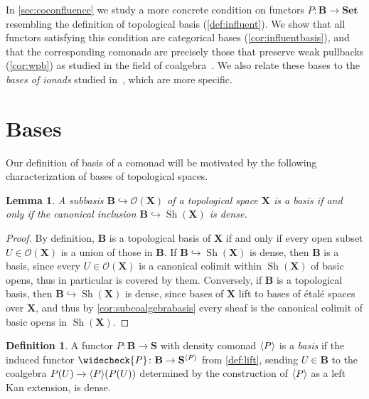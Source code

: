 \documentclass[11pt, oneside, article]{memoir}
\theoremstyle{plain}
\newtheorem{lemma}[theorem]{Lemma}
\theoremstyle{definition}
\newtheorem{definition}[def]{Definition}
\theoremstyle{remark}
\DeclareMathOperator{\Sh}{Sh}
\DeclarePairedDelimiter{\gen}{\langle}{\rangle}
\newcommand{\namedcat}[1]{\mathbf{#1}}
\newcommand{\cat}[1]{\mathbf{#1}}
\newcommand{\spa}[1]{\mathbf{#1}}
\newcommand{\Set}{\namedcat{Set}}
\newcommand{\CoalgOn}[2]{{#2}^{#1}}
\newcommand{\CoalgS}[1]{\CoalgOn{#1}{\bS}}
\newcommand{\lift}[1]{\widecheck{#1}}
\newcommand{\ph}[1]{#1}
\newcommand{\xU}{U}
\newcommand{\bB}{\cat{B}}
\newcommand{\bS}{\cat{S}}
\newcommand{\pP}{\ph{P}}
\newcommand{\cP}{\gen{\pP}}
\newcommand{\lP}{\lift{\pP}}
\newcommand{\tX}{\spa{X}}
\newcommand{\PS}{\CoalgS{\cP}}
\newcommand{\opens}[1]{\mathcal{O}(#1)}
\begin{document}
In \cref{sec:coconfluence} we study a more concrete condition on
functors $\pP \colon \bB \to \Set$ resembling the definition of
topological basis (\cref{def:influent}). We show that all functors
satisfying this condition are categorical bases
(\cref{cor:influentbasis}), and that the corresponding comonads are
precisely those that preserve weak pullbacks (\cref{cor:wpb}) as
studied in the field of
coalgebra~\cite{rutten,johnstone-power-tsujishita-watanabe-worrell,jacobs,adamek-velebil,gumm-schroder,gumm:elements}. We
also relate these bases to the \emph{bases of ionads} studied
in~\cite{garner:ionads}, which are more specific.

\section{Bases}\label{sec:basessub}

Our definition of basis of a comonad will be motivated by the
following characterization of bases of topological spaces.

\begin{lemma}\label{lem:topbasis}
  A subbasis $\bB \hookrightarrow \opens{\tX}$ of a topological
  space $\tX$ is a basis if and only if the canonical inclusion
  $\bB \hookrightarrow \Sh(\tX)$ is dense.
\end{lemma}
\begin{proof}
  By definition, $\bB$ is a topological basis of $\tX$ if and only if
  every open subset $\xU \in\opens{\tX}$ is a union of those in
  $\bB$. If $\bB \hookrightarrow \Sh(\tX)$ is dense, then $\bB$ is a
  basis, since every $\xU \in \opens{\tX}$ is a canonical colimit within
  $\Sh(\tX)$ of basic opens, thus in particular is covered by
  them. Conversely, if $\bB$ is a topological basis, then
  $\bB \hookrightarrow \Sh(\tX)$ is dense, since bases of $\tX$ lift
  to bases of \'etal\'e spaces over $\tX$, and thus by
  \cref{cor:subcoalgebrabasis} every sheaf is the canonical colimit of
  basic opens in $\Sh(\tX)$.
\end{proof}

\begin{definition}\label{def:basis}
  A functor $\pP \colon \bB \to \bS$ with density comonad $\cP$ is a
  \emph{basis} if the induced functor $\lP \colon \bB \to \PS$ from
  \cref{def:lift}, sending $U\in \bB$ to the coalgebra 
  $P(U)\to \cP(P(U))$ determined by the construction of $\cP$ as a left
  Kan extension, is dense.
\end{definition}
\end{document}
